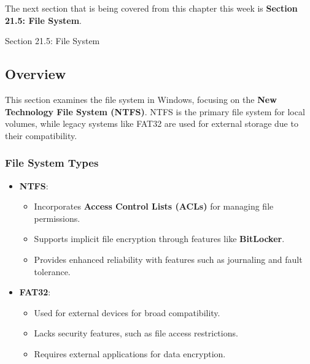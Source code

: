 The next section that is being covered from this chapter this week is \textbf{Section 21.5: File System}.

\begin{notes}{Section 21.5: File System}
    \subsection*{Overview}
    This section examines the file system in Windows, focusing on the \textbf{New Technology File System (NTFS)}. NTFS is the primary file system for local volumes, while legacy systems like FAT32 are 
    used for external storage due to their compatibility.

    \subsubsection*{File System Types}
    \begin{itemize}
        \item \textbf{NTFS}:
        \begin{itemize}
            \item Incorporates \textbf{Access Control Lists (ACLs)} for managing file permissions.
            \item Supports implicit file encryption through features like \textbf{BitLocker}.
            \item Provides enhanced reliability with features such as journaling and fault tolerance.
        \end{itemize}
        \item \textbf{FAT32}:
        \begin{itemize}
            \item Used for external devices for broad compatibility.
            \item Lacks security features, such as file access restrictions.
            \item Requires external applications for data encryption.
        \end{itemize}
    \end{itemize}


\end{notes}
